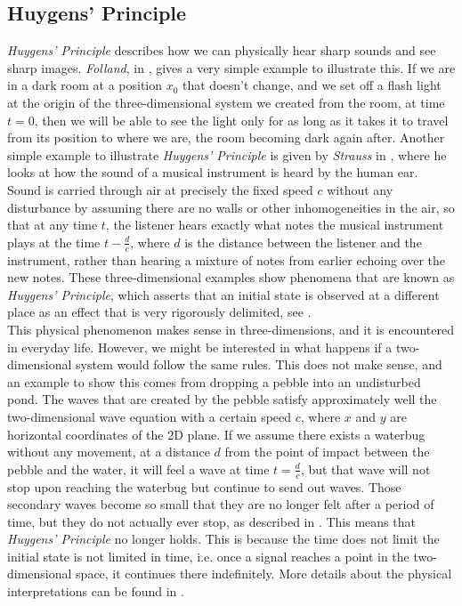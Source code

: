 \documentclass[a4paper, 12pt]{article}
\numberwithin{equation}{section}
\begin{document}
\subsection{Huygens' Principle}
\emph{Huygens' Principle} describes how we can physically hear sharp sounds and see sharp images. \emph{Folland}, in \cite{Fol}, gives a very simple example to illustrate 
this. If we are in a dark room at a position $x_0$ that doesn't change, and we set off a flash light at the origin of the three-dimensional system we 
created from the room, at time $t=0$, then we will be able to see the light only for as long as it takes it to travel from its position to where we are, the room
becoming dark again after. Another simple example to illustrate \emph{Huygens' Principle} is given by \emph{Strauss} in \cite{Str}, where he looks at how the sound
of a musical instrument is heard by the human ear. Sound is carried through air at precisely the fixed speed $c$ without any disturbance by assuming
there are no walls or other inhomogeneities in the air, so that at any time $t$, the listener hears exactly what notes the musical instrument plays at the time $t-\frac{d}{c}$,
where $d$ is the distance between the listener and the instrument, rather than hearing a mixture of notes from earlier echoing over the new notes. These three-dimensional 
examples show phenomena that are known as \emph{Huygens' Principle}, which asserts that an initial state is observed at a different place as an effect that is 
very rigorously delimited, see \cite{Hil} .
\\

This physical phenomenon makes sense in three-dimensions, and it is encountered in everyday life. However, we might be interested in what happens if a two-dimensional system would follow
the same rules. This does not make sense, and an example to show this comes from dropping a pebble into an undisturbed pond. The waves that are created by the pebble satisfy 
approximately well the two-dimensional wave equation with a certain speed $c$, where $x$ and $y$ are horizontal coordinates of the 2D plane. If we assume there exists
a waterbug without any movement, at a distance $d$ from the point of impact between the pebble and the water, it will feel a wave at time $t=\frac{d}{c}$, but that wave will
not stop upon reaching the waterbug but continue to send out waves. Those secondary waves become so small that they are no longer felt after a period of time, but they 
do not actually ever stop, as described in \cite{Str}. This means that \emph{Huygens' Principle} no longer holds. This is because the time does not limit the initial state is not limited 
in time, i.e. once a signal reaches a point in the two-dimensional space, it continues there indefinitely. More details about the physical interpretations can be found in \cite{Hil}.
\\
\end{document}
